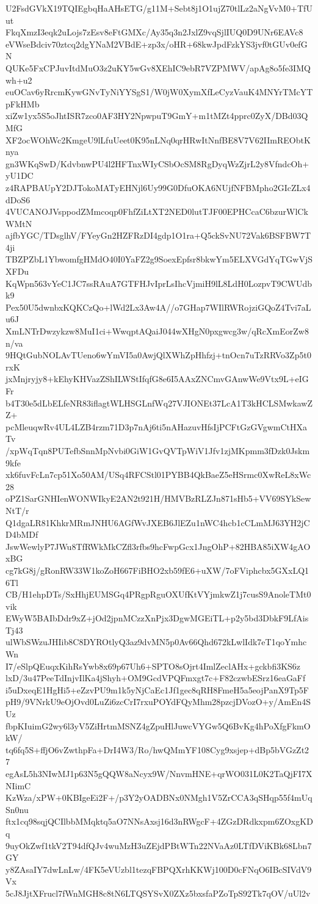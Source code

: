 U2FsdGVkX19TQIEgbqHaAHsETG/g11M+Sebt8j1O1ujZ70tlLz2aNgVvM0+TfUut
FkqXmzI3eqk2uLojs7zEsv8eFtGMXc/Ay35q3n2JxlZ9vqSjlIUQ0D9UNr6EAVc8
eVWseBdciv70ztcq2dgYNaM2VBdE+zp3x/oHR+68kwJpdFzkYS3jvf0tGUv0efGN
QUKe5FxCPJuvItdMuO3z2uKY5wGv8XEhIC9ebR7VZPMWV/apAg8o5fe3IMQwh+u2
euOCav6yRrcmKywGNvTyNiYYSgS1/W0jW0XymXfLeCyzVauK4MNYrTMcYTpFkHMb
xiZw1yx5S5oJhtISR7zco0AF3HY2NpwpuT9GmY+m1tMZt4pprc0ZyX/DBd03QMfG
XF2ocWOhWc2KmgeU9lLfuUeet0K95nLNq0qrHRwItNnfBE8V7V62IImREObtKnya
gn3WKqSwD/KdvbnwPU4l2HFTnxWIyCSbOcSM8RgDyqWzZjrL2y8VfndcOh+yU1DC
z4RAPBAUpY2DJTokoMATyEHNjl6Uy99G0DfuOKA6NUjfNFBMpho2GIcZLx4dDoS6
4VUCANOJVsppodZMmcoqp0FhfZiLtXT2NED0lutTJF00EPHCcaC6bzurWlCkWMtN
ajfbYGC/TDsglhV/FYeyGn2HZFRzDI4gdp1O1ra+Q5ckSvNU72Vak6BSFBW7T4ji
TBZPZbL1YbwomfgHMdO40I0YaFZ2g9SoexEpfsr8bkwYm5ELXVGdYqTGwVjSXFDu
KqWpn563vYeC1JC7ssRAuA7GTFHJvIprLsIhcVjmiH9lL8LdH0LozpvT9CWUdbk9
Pex50U5dwnbxKQKCzQo+lWd2Lx3Aw4A//o7GHap7WIlRWRojziGQoZ4Tvi7aLu6J
XmLNTrDwzykzw8MuI1ci+WwqptAQaiJ044wXHgN0pxgwcg3w/qRcXmEorZw8n/va
9HQtGubNOLAvTUeno6wYmVI5a0AwjQlXWhZpHhfzj+tnOcn7uTzRRVo3Zp5t0rxK
jxMnjryjy8+kEhyKHVazZShILWStIfqfG8e6I5AAxZNCmvGAnwWe9Vtx9L+eIGFr
b4T30e5dLbELfeNR83iflagtWLHSGLnfWq27VJIONEt37LcA1T3kHCLSMwkawZZ+
pcMleuqwRv4UL4LZB4rzm71D3p7nAj6ti5nAHazuvHfsIjPCFtGzGVgwmCtHXaTv
/xpWqTqn8PUTefbSnnMpNvbi0GiW1GvQVTpWiV1Jfv1zjMKpmm3fDzk0Jskm9kfe
xk6fuvFcLn7cp51Xo50AM/USq4RFCStl01PYBB4QkBaeZ5eHSrmc0XwReL8xWc28
oPZ1SarGNHIenWONWIkyE2AN2t921H/HMVBzRLZJn871sHb5+VV69SYkSewNtT/r
Q1dgaLR81KhkrMRmJNHU6AGfWvJXEB6JlEZu1nWC4hcb1cCLmMJ63YH2jCD4bMDf
JswWewlyP7JWu8TfRWkMkCZfl3rfbs9hcFwpGcx1JngOhP+82HBA85iXW4gAOxBG
cg7kG8j/gRonRW33W1koZoH667FiBHO2xb59fE6+uXW/7oFViphcbx5GXxLQ16Tl
CB/H1ehpDTs/SxHhjEUMSGq4PRgpRguOXUfKtVYjmkwZ1j7cusS9AnoleTMt0vik
EWyW5BAIbDdr9xZ+jOd2jpnMCzzXnPjx3DgwMGEiTL+p2y5bd3DbkF9LfAisTj43
ulWbSWzuJHIib8C8DYROtlyQ3az9dvMN5p0Av66Qhd672kLwlIdk7eT1qoYmhcWn
I7/eSlpQEuqxKihRsYwb8x69p67Uh6+SPTO8sOjrt4ImlZeclAHx+gckbfi3KS6z
lxD/3u47PeeTdInjvIlKa4jShyh+OM9GcdVPQFmxgt7c+F82czwbESrz16eaGaFf
i5uDxeqE1HgHi5+eZzvPU9m1k5yNjCaEc1Jf1gec8qRH8FmeH5a5eojPanX9Tp5F
pH9/9VNrkU9eOjOvd0LuZi6zcCrI7rxuPOYdFQyMhm28pzcjDVozO+y/AmEn4SUz
fbpKIuimG2wy6l3yV5ZiHrtmMSNZ4gZpuHlJuwcVYGw5Q6BvKg4hPoXfgFkmOkW/
tq6fq5S+ffjO6vZwthpFa+DrI4W3/Ro/hwQMmYF108Cyg9xsjep+dBp5bVGzZt27
egAsL5h3NIwMJ1p63N5gQQW8aNcyx9W/NnvmHNE+qrWO031L0K2TaQjFI7XNIimC
KzWza/xPW+0KBIgeEi2F+/p3Y2yOADBNx0NMgh1V5ZrCCA3qSHqp55f4mUqSn0nu
ftx1cq98sqjQCIlbbMMqktq5aO7NNsAxsj16d3nRWgcF+4ZGzDRdkxpm6ZOxgKDq
9uyOkZwf1tkV2T94dfQJv4wuMzH3uZEjdPBtWTn22NVaAz0LTfDViKBk68Lbn7GY
y8ZAsaIY7dwLnLw/4FK5eVUzbl1tezqFBPQXrhKKWj100D0cFNqO6IBcSIVdV9Vx
5cJ8JjtXFrucl7fWnMGH8c8tN6LTQSYSvX0ZXz5bxsfaPZoTpS92Tk7qOV/uUl2v
